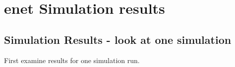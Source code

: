 \documentclass[
]{book}
\begin{document}
\hypertarget{enet-simulation-results}{%
\section*{enet Simulation results}\label{enet-simulation-results}}

\hypertarget{simulation-results---look-at-one-simulation-2}{%
\subsection*{Simulation Results - look at one simulation}\label{simulation-results---look-at-one-simulation-2}}

First examine results for one simulation run.
\end{document}
